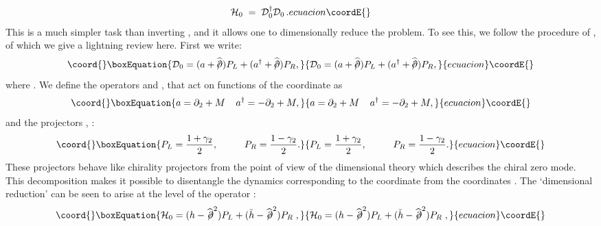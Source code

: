 \documentclass[a4paper,12pt]{article}
\begin{document}
{{\begin{equation}
{}{
   {\mathcal H}_0 \;=\; {\mathcal D}_0^\dagger {\mathcal D}_0 \,.
}{ecuacion}\coordE{}\end{equation}
This is a much simpler task than inverting \coordHE{}, and it
allows one to dimensionally reduce the problem. To see this, we follow
the procedure of \cite{p1}, of which we give a lightning review here.
First we write:
\begin{equation}\coord{}\boxEquation{
{\mathcal D}_0 = (a + \widehat{/\!\!\!\partial} ) P_L + (a^{\dagger} + \widehat{/\!\!\!\partial}
 ) P_R \label{Ddea} ,
}{
{\mathcal D}_0 = (a + \widehat{/\!\!\!\partial} ) P_L + (a^{\dagger} + \widehat{/\!\!\!\partial}
 ) P_R ,
}{ecuacion}\coordE{}\end{equation}
where \coordHE{}.  We define the operators \coordHE{} and \coordHE{}, that act
on functions of the \coordHE{} coordinate as
\begin{equation}\coord{}\boxEquation{
   \label{op2}
a = \partial_2 + M \;\;\;\; a^{\dagger} = -\partial_2 + M,
}{
   a = \partial_2 + M \;\;\;\; a^{\dagger} = -\partial_2 + M,
}{ecuacion}\coordE{}\end{equation}
and the projectors \coordHE{}, \coordHE{}:
\begin{equation}\coord{}\boxEquation{\label{op3}
P_L = \frac{1 + \gamma_2}{2}, \;\;\;\;\;\;\;\;\;\; P_R = \frac{1 -
\gamma_2}{2}.
}{P_L = \frac{1 + \gamma_2}{2}, \;\;\;\;\;\;\;\;\;\; P_R = \frac{1 -
\gamma_2}{2}.
}{ecuacion}\coordE{}\end{equation}
These projectors behave like chirality projectors from the point of
view of the \coordHE{} dimensional theory which describes the chiral zero
mode.  This decomposition makes it possible to disentangle the
dynamics corresponding to the \coordHE{} coordinate from the coordinates
\coordHE{}.  The `dimensional reduction' can be seen to
arise at the level of the operator \coordHE{}:
\begin{equation}\coord{}\boxEquation{
   \label{Hdea}
{\mathcal H}_0 =
(h - \widehat{\not\!\partial}^2) P_L + (\tilde{h} - \widehat{\not\!\partial}^2) P_R \;,
}{
   {\mathcal H}_0 =
(h - \widehat{\not\!\partial}^2) P_L + (\tilde{h} - \widehat{\not\!\partial}^2) P_R \;,
}{ecuacion}\coordE{}\end{equation}
}}
\end{document}
